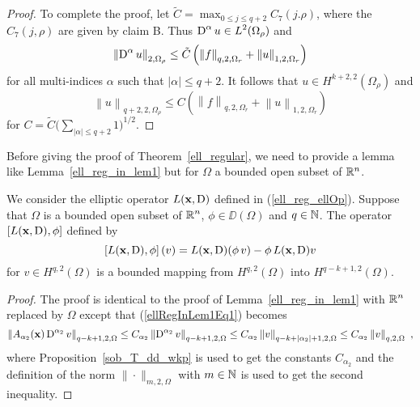 \begin{proof}
 To complete the proof, let
$\displaystyle \tilde{C} = \max_{0\leq j \leq q+2} C_7(j.\rho)$, where the
$C_7(j,\rho)$ are given by claim B.  Thus
$\displaystyle \operatorname{D}^\alpha u \in L^2(\Omega_\rho)$ and
\[
\left\|\operatorname{D}^\alpha u \right\|_{2,\Omega_\rho} \leq \tilde{C} \left(
\left\|f\right\|_{q,2,\Omega_r} + \left\|u\right\|_{1,2,\Omega_r}
\right)
\]
for all multi-indices $\alpha$ such that $|\alpha|\leq q+2$.  It follows
that $u \in H^{k+2,2}(\Omega_\rho)$ and
\[
\left\|u \right\|_{q+2,2,\Omega_\rho} \leq C \left(
\left\|f\right\|_{q,2,\Omega_r} + \left\|u\right\|_{1,2,\Omega_r}
\right)
\]
for $\displaystyle C = \tilde{C} \Big(\sum_{|\alpha|\leq q+2} 1\Big)^{1/2}$.
\end{proof}

Before giving the proof of Theorem~\ref{ell_regular}, we
need to provide a lemma like Lemma~\ref{ell_reg_in_lem1} but for
$\Omega$ a bounded open subset of $\mathbb{R}^n$.

\begin{lemma} \label{ell_reg_out_lem1}
We consider the elliptic operator $L(\mathbf{x},\operatorname{D})$ defined in
(\ref{ell_reg_ellOp}).  Suppose that $\Omega$ is a bounded open subset
of $\displaystyle \mathbb{R}^n$, $\phi \in \DD(\Omega)$ and $q\in \mathbb{N}$.
The operator $\left[ L(\mathbf{x},\operatorname{D}), \phi\right]$ defined by
\[
\left[ L(\mathbf{x},\operatorname{D}), \phi\right](v)
= L(\mathbf{x},\operatorname{D}) (\phi\, v) - \phi\, L(\mathbf{x},\operatorname{D}) v
\]
for $\displaystyle v \in \displaystyle H^{q,2}(\Omega)$ is a bounded
mapping from $\displaystyle H^{q,2}(\Omega)$ into
$\displaystyle H^{q-k+1,2}(\Omega)$.
\end{lemma}

\begin{proof}
The proof is identical to the proof of Lemma~\ref{ell_reg_in_lem1}
with $\displaystyle \mathbb{R}^n$ replaced by $\Omega$ except that
(\ref{ellRegInLem1Eq1}) becomes
\[
\left\| A_{\alpha_2}(\mathbf{x}) \operatorname{D}^{\alpha_2} v \right\|_{q-k+1,2,\Omega}
\leq C_{\alpha_2} \left\| \operatorname{D}^{\alpha_2} v \right\|_{q-k+1,2,\Omega}
\leq C_{\alpha_2} \left\| v \right\|_{q-k+|\alpha_2|+1,2,\Omega}
\leq C_{\alpha_2} \left\| v \right\|_{q,2,\Omega} \ ,
\]
where Proposition~\ref{sob_T_dd_wkp} is used to get the constants
$C_{\alpha_2}$ and the definition of the norm $\|\cdot\|_{m,2,\Omega}$
with $m\in \mathbb{N}$ is used to get the second inequality.
\end{proof}


